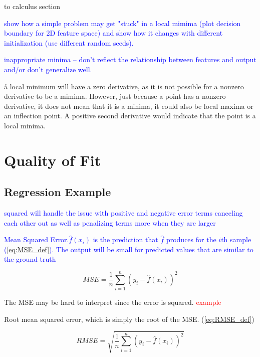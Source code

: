 \ALR to calculus section

\textcolor{blue}{show how a simple problem may get "stuck" in a local mimima (plot decision boundary for 2D feature space) and show how it changes with different initialization (use different random seeds). }

\textcolor{blue}{{inappropriate minima} -- don't reflect the relationship between features and output and/or don't generalize well.}

\r{a local minimum will have a zero derivative, as it is not possible for a nonzero derivative to be a mimima.  However, just because a point has a nonzero derivative, it does not mean that it is a minima, it could also be local maxima or an inflection point. A positive second derivative would indicate that the point is a local minima.}

\section{Quality of Fit}


\subsection{Regression Example}


\textcolor{blue}{squared will handle the issue with positive and negative error terms canceling each other out as well as penalizing terms more when they are larger}

\textcolor{blue}{Mean Squared Error.$\hat{f}(x_i)$ is the prediction that $\hat{f}$ produces for the $i$th sample (\ref{eq:MSE_def}). The output will be small for predicted values that are similar to the ground truth}

\begin{equation}
{MSE = \frac{1}{n}\sum_{i=1}^{n}(y_i - \hat{f}(x_i))^2}
\label{eq:MSE_def}
\end{equation}

\r{The MSE may be hard to interpret since the error is squared. \textcolor{red}{example}}

\r{Root mean squared error, which is simply the root of the MSE. (\ref{eq:RMSE_def})}

\begin{equation}
{RMSE = \sqrt{\frac{1}{n}\sum_{i=1}^{n}(y_i - \hat{f}(x_i))^2}}
\label{eq:RMSE_def}
\end{equation}


